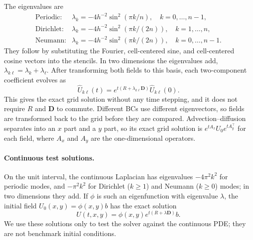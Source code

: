 The eigenvalues are
\[
\begin{array}{ll}
\text{Periodic:}&\lambda_k=-4h^{-2}\sin^2(\pi k/n),\quad k=0,\ldots,n-1,\\[2pt]
\text{Dirichlet:}&\lambda_k=-4h^{-2}\sin^2(\pi k/(2n)),\quad k=1,\ldots,n,\\[2pt]
\text{Neumann:}&\lambda_k=-4h^{-2}\sin^2(\pi k/(2n)),\quad k=0,\ldots,n-1.
\end{array}
\]
They follow by substituting the Fourier, cell-centered sine, and cell-centered cosine vectors into the stencils. In two dimensions the eigenvalues add, $\lambda_{k\ell}=\lambda_k+\lambda_\ell$. After transforming both fields to this basis, each two-component coefficient evolves as
\[
 \widehat U_{k\ell}(t)
 =e^{t(R+\lambda_{k\ell}\mathbf D)}\widehat U_{k\ell}(0).
\]
This gives the exact grid solution without any time stepping, and it does not require $R$ and $\mathbf D$ to commute. Different BCs use different eigenvectors, so fields are transformed back to the grid before they are compared. Advection--diffusion separates into an $x$ part and a $y$ part, so its exact grid solution is $e^{tA_x}U_0e^{tA_y^\top}$ for each field, where $A_x$ and $A_y$ are the one-dimensional operators.

\paragraph{Continuous test solutions.}
On the unit interval, the continuous Laplacian has eigenvalues $-4\pi^2k^2$ for periodic modes, and $-\pi^2k^2$ for Dirichlet ($k\geq1$) and Neumann ($k\geq0$) modes; in two dimensions they add. If $\phi$ is such an eigenfunction with eigenvalue $\lambda$, the initial field $U_0(x,y)=\phi(x,y)b$ has the exact solution
\[
 U(t,x,y)=\phi(x,y)e^{t(R+\lambda\mathbf D)}b.
\]
We use these solutions only to test the solver against the continuous PDE; they are not benchmark initial conditions.
